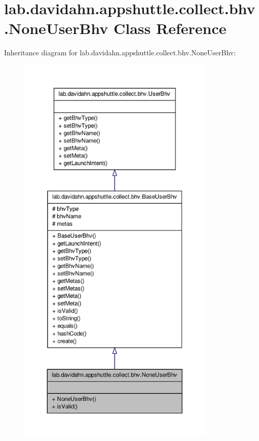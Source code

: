 \hypertarget{classlab_1_1davidahn_1_1appshuttle_1_1collect_1_1bhv_1_1_none_user_bhv}{\section{lab.\-davidahn.\-appshuttle.\-collect.\-bhv.\-None\-User\-Bhv \-Class \-Reference}
\label{classlab_1_1davidahn_1_1appshuttle_1_1collect_1_1bhv_1_1_none_user_bhv}
}


\-Inheritance diagram for lab.\-davidahn.\-appshuttle.\-collect.\-bhv.\-None\-User\-Bhv\-:
\nopagebreak
\begin{figure}[H]
\begin{center}
\leavevmode
\includegraphics[height=550pt]{classlab_1_1davidahn_1_1appshuttle_1_1collect_1_1bhv_1_1_none_user_bhv__inherit__graph}
\end{center}
\end{figure}


